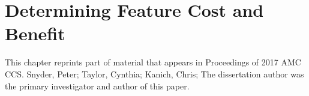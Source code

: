 \chapter{Determining Feature Cost and Benefit}
\label{cost-benefit}

This chapter reprints part of material that appears in
Proceedings of 2017 AMC CCS. Snyder, Peter; Taylor,
Cynthia; Kanich, Chris; The dissertation author was the primary investigator and
author of this paper.






